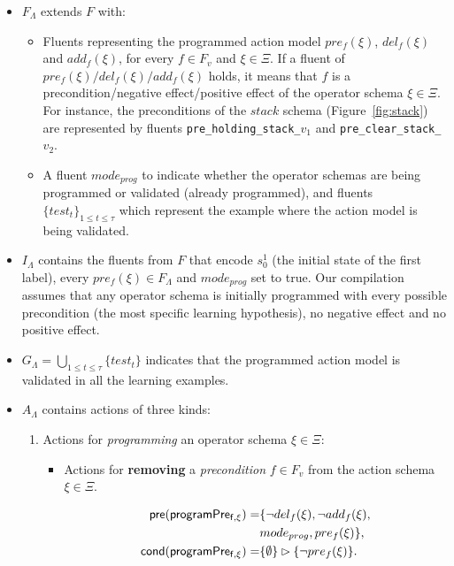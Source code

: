 \documentclass[letterpaper]{article} %
\newcommand{\pre}{\mathsf{pre}}     %
\newcommand{\cond}{\mathsf{cond}}   %
\begin{document}
\begin{itemize}
\item $F_{\Lambda}$ extends $F$ with:
\begin{itemize}
\item Fluents representing the programmed action model $pre_f(\xi)$, $del_f(\xi)$ and $add_f(\xi)$, for every $f\in F_v$ and $\xi \in \Xi$. If a fluent of $pre_f(\xi)/del_f(\xi)/add_f(\xi)$ holds, it means that $f$ is a precondition/negative effect/positive effect of the operator schema $\xi\in \Xi$. For instance, the preconditions of the $stack$ schema (Figure~\ref{fig:stack}) are represented by fluents {\small\tt pre\_holding\_stack\_$v_1$} and {\small\tt pre\_clear\_stack\_$v_2$}.
\item A fluent $mode_{prog}$ to indicate whether the operator schemas are being programmed or validated (already programmed), and fluents $\{test_t\}_{1\leq t\leq \tau}$ which represent the example where the action model is being validated.
\end{itemize}
\item $I_{\Lambda}$ contains the fluents from $F$ that encode $s_0^1$ (the initial state of the first label), every $pre_f(\xi)\in F_{\Lambda}$ and $mode_{prog}$ set to true. Our compilation assumes that any operator schema is initially programmed with every possible precondition (the most specific learning hypothesis), no negative effect and no positive effect.
\item $G_{\Lambda}=\bigcup_{1\leq t\leq \tau}\{test_t\}$ indicates that the programmed action model is validated in all the learning examples.
\item $A_{\Lambda}$ contains actions of three kinds:
\begin{enumerate}
\item Actions for {\em programming} an operator schema $\xi\in\Xi$:
\begin{itemize}
\item Actions for {\bf removing} a {\em precondition} $f\in F_v$ from the action schema $\xi\in\Xi$.

\begin{small}
\begin{align*}
\hspace*{7pt}\pre(\mathsf{programPre_{f,\xi}})=&\{\neg del_{f}(\xi),\neg add_{f}(\xi),\\
& mode_{prog}, pre_{f}(\xi)\},\\
\cond(\mathsf{programPre_{f,\xi}})=&\{\emptyset\}\rhd\{\neg pre_{f}(\xi)\}.
\end{align*}
\end{small}


\end{itemize}
\end{enumerate}
\end{itemize}
\end{document}
